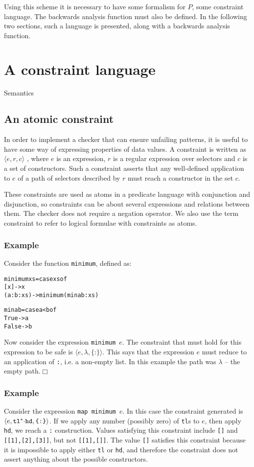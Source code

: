 \documentclass[preprint]{sigplanconf}
\newcommand{\T}[1]{\texttt{#1}}
\newcommand{\tup}[1]{\ensuremath{\langle #1 \rangle}}
\newcounter{exmp}
\newcommand{\yesexample}{\subsubsection*{Example \arabic{exmp}}\addtocounter{exmp}{1}}
\newcommand{\noexample}{\hfill$\Box$}
\newenvironment{code}{\begin{alltt}\small}{\end{alltt}}
\newcommand{\K}{\ensuremath{^\ast}} %
\newcommand{\D}{\ensuremath{\cdot}} %
\renewcommand{\c}[3]{\tup{\T{#1},\T{#2},\T{\{#3\}}}}
\newcommand{\cc}[2]{\c{#1}{$\lambda$}{#2}}
\begin{document}
Using this scheme it is necessary to have some formalism for $P$, some
constraint language. The backwards analysis function must also be defined. In
the following two sections, such a language is presented, along with a
backwards analysis function.


\section{A constraint language}
\label{chap:constraints}

Semantics

\subsection{An atomic constraint}

In order to implement a checker that can ensure unfailing patterns,
it is useful to have some way of expressing properties of data
values. A constraint is written as $\tup{e,r,c}$ , where $e$ is an
expression, $r$ is a regular expression over selectors and $c$ is a
set of constructors. Such a constraint asserts that any well-defined
application to $e$ of a path of selectors described by $r$ must
reach a constructor in the set $c$.

These constraints are used as atoms in a predicate language with
conjunction and disjunction, so constraints can be about several
expressions and relations between them. The checker does not require
a negation operator. We also use the term constraint to refer to
logical formulae with constraints as atoms.

\yesexample

Consider the function \T{minimum}, defined as:

\begin{code}
minimum xs = case xs of
                  [x]      -> x
                  (a:b:xs) -> minimum (min a b : xs)

min a b = case a < b of
               True  -> a
               False -> b
\end{code}

Now consider the expression \T{minimum $e$}. The constraint that
must hold for this expression to be safe is \cc{$e$}{:}. This says
that the expression $e$ must reduce to an application of \T{:}, i.e.
a non-empty list. In this example the path was $\lambda$ -- the
empty path.\noexample

\yesexample

Consider the expression \T{map minimum $e$}. In this case the
constraint generated is \c{$e$}{tl\K\D hd}{:}. If we apply any
number (possibly zero) of \T{tl}s to $e$, then apply \T{hd}, we
reach a \T{:} construction. Values satisfying this constraint
include \T{[]} and \T{[[1],[2],[3]]}, but not \T{[[1],[]]}. The
value \T{[]} satisfies this constraint because it is impossible to
apply either \T{tl} or \T{hd}, and therefore the constraint does not
assert anything about the possible constructors.
\end{document}
